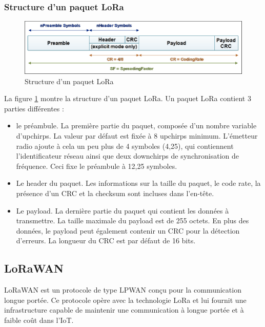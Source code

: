 \subsubsection{Structure d'un paquet LoRa}\label{packetlora}

\begin{figure}[h]
\centering

\includegraphics[scale=0.4]{images/lorapacket.png}
\caption{Structure d'un paquet LoRa\cite{lorapacket}}\label{term6}
\end{figure}


La figure \ref{term6} montre la structure d'un paquet \ac{LoRa}. Un paquet \ac{LoRa} contient 3 parties différentes \cite{loraphy} :

\vspace{0.1cm}

\begin{itemize}
\item le préambule. La première partie du paquet, composée d'un nombre variable d'upchirps. La valeur par défaut est fixée à 8 upchirps minimum. L'émetteur radio ajoute à cela un peu plus de 4 symboles (4,25), qui contiennent l'identificateur réseau ainsi que deux downchirps de synchronisation de fréquence. Ceci fixe le préambule à 12,25 symboles.
\item Le header du paquet. Les informations sur la taille du paquet, le code rate, la présence d'un \ac{CRC} et la checksum sont incluses dans l'en-tête.
\item Le payload. La dernière partie du paquet qui contient les données à transmettre. La taille maximale du payload est de 255 octets. En plus des données, le payload peut également contenir un \ac{CRC} pour la détection d'erreurs. La longueur du \ac{CRC} est par défaut de 16 bits.
\end{itemize}

\newpage
\subsection{LoRaWAN}\label{lorawan}

LoRaWAN est un protocole de type \ac{LPWAN} conçu pour la communication longue portée. Ce protocole opère avec la technologie \ac{LoRa} et lui fournit une infrastructure capable de maintenir une communication à longue portée et à faible coût dans l'\ac{IoT}.

